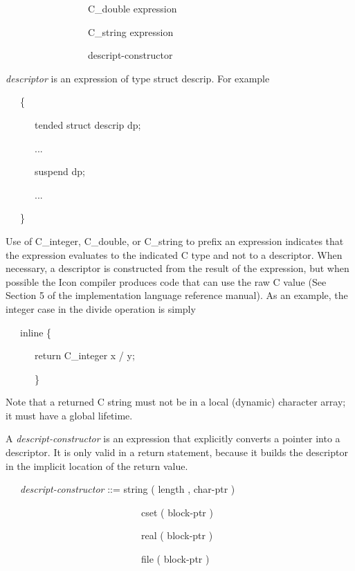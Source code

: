 {\ttfamily\mdseries
\ \ \ \ \ \ \ \ \ \ \ \ \ \ \ \ \ C\_double expression {\textbar}}

{\ttfamily\mdseries
\ \ \ \ \ \ \ \ \ \ \ \ \ \ \ \ \ C\_string expression {\textbar}}

{\ttfamily\mdseries
\ \ \ \ \ \ \ \ \ \ \ \ \ \ \ \ \ descript-constructor}


\textit{descriptor} is an expression of type struct descrip. For example 

{\ttfamily\mdseries
\ \ \ \{}

{\ttfamily\mdseries
\ \ \ \ \ \ tended struct descrip dp;}

{\ttfamily\mdseries
\ \ \ \ \ \ ...}

{\ttfamily\mdseries
\ \ \ \ \ \ suspend dp;}

{\ttfamily\mdseries
\ \ \ \ \ \ ...}

{\ttfamily\mdseries
\ \ \ \}}


Use of C\_integer, C\_double, or C\_string to prefix an expression
indicates that the expression evaluates to the indicated C type and
not to a descriptor. When necessary, a descriptor is constructed from
the result of the expression, but when possible the Icon compiler
produces code that can use the raw C value (See Section 5 of the
implementation language reference manual). As an example, the integer
case in the divide operation is simply

{\ttfamily\mdseries
\ \ \ inline \{}

{\ttfamily\mdseries
\ \ \ \ \ \ return C\_integer x / y;}

{\ttfamily\mdseries
\ \ \ \ \ \ \}}


Note that a returned C string must not be in a local (dynamic)
character array; it must have a global lifetime.

A \textit{descript-constructor} is an expression that explicitly
converts a pointer into a descriptor. It is only valid in a return
statement, because it builds the descriptor in the implicit location
of the return value.

{\ttfamily\mdseries
\ \ \ \textit{descript-constructor} ::= string ( length , char-ptr ) {\textbar}}

{\ttfamily\mdseries
\ \ \ \ \ \ \ \ \ \ \ \ \ \ \ \ \ \ \ \ \ \ \ \ \ \ \ \ cset ( block-ptr ) {\textbar}}

{\ttfamily\mdseries
\ \ \ \ \ \ \ \ \ \ \ \ \ \ \ \ \ \ \ \ \ \ \ \ \ \ \ \ real ( block-ptr ) {\textbar}}

{\ttfamily\mdseries
\ \ \ \ \ \ \ \ \ \ \ \ \ \ \ \ \ \ \ \ \ \ \ \ \ \ \ \ file ( block-ptr ) {\textbar}}

